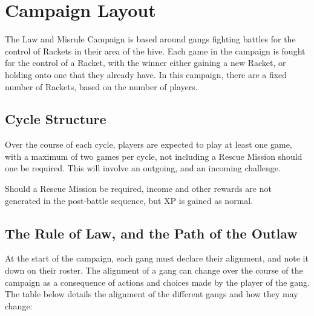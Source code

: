 \documentclass[a4paper]{article}
\begin{document}
	\section*{Campaign Layout}
	The Law and Misrule Campaign is based around gangs fighting battles for the control of Rackets in their area of the hive. Each game in the campaign is fought for the control of a Racket, with the winner either gaining a new Racket, or holding onto one that they already have. In this campaign, there are a fixed number of Rackets, based on the number of players.

	\subsection*{Cycle Structure}
	Over the course of each cycle, players are expected to play at least one game, with a maximum of two games per cycle, not including a Rescue Mission should one be required. This will involve an outgoing, and an incoming challenge.

	Should a Rescue Mission be required, income and other rewards are not generated in the post-battle sequence, but XP is gained as normal.

	\subsection*{The Rule of Law, and the Path of the Outlaw}
	At the start of the campaign, each gang must declare their alignment, and note it down on their roster. The alignment of a gang can change over the course of the campaign as a consequence of actions and choices made by the player of the gang. The table below details the alignment of the different gangs and how they may change:
\end{document}
